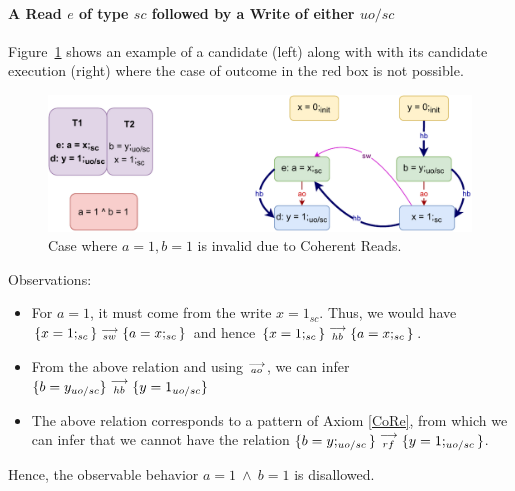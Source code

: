     \paragraph{A Read $e$ of type $sc$ followed by a Write of either $uo/sc$}
        
        Figure~\ref{reord_counter:example2(a)} shows an example of a candidate (left) along with with its candidate execution (right) where the case of outcome in the red box is not possible. 
        \begin{figure}[H]
            \centering
            \includegraphics[scale=0.7]{7.CounterExamples/ReorderingCandidate/Example3(Rsc-Wuo,sc).pdf}
            \caption{Case where $a = 1, b = 1$ is invalid due to Coherent Reads.}
            \label{reord_counter:example2(a)}
        \end{figure}

        Observations:
        \begin{itemize}
            \item For $a=1$, it must come from the write $x=1_{sc}$. 
            Thus, we would have $\{x=1;_{sc}\}\stackrel{\longrightarrow}{_{sw}}\{a=x;_{sc}\}$ and hence $\{x=1;_{sc}\}\stackrel{\longrightarrow}{_{hb}}\{a=x;_{sc}\}$.
            \item From the above relation and using $\stackrel{\longrightarrow}{_{ao}}$, we can infer $\{b=y_{uo/sc}\}\stackrel{\longrightarrow}{_{hb}}\{y=1_{uo/sc}\}$
            \item The above relation corresponds to a pattern of Axiom \ref{CoRe}, from which we can infer that we cannot have the relation  $\{b=y;_{uo/sc}\}\stackrel{\longrightarrow}{_{rf}}\{y=1;_{uo/sc}\}$.        
        \end{itemize}
        Hence, the observable behavior $a=1 \ \wedge \ b=1$ is disallowed.

